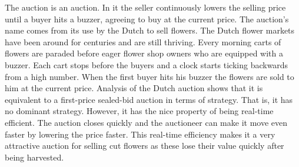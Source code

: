 \medskip


The  auction is an  auction.
In it the seller continuously lowers the selling price until a buyer
hits a buzzer, agreeing to buy at the current price. The auction's
name comes from its use by the Dutch to sell flowers. The Dutch flower
markets have been around for centuries and are still thriving. Every
morning carts of flowers are paraded before eager flower shop owners
who are equipped with a buzzer. Each cart stops before the buyers and
a clock starts ticking backwards from a high number. When the first
buyer hits his buzzer the flowers are sold to him at the current
price. Analysis of the Dutch auction shows that it is equivalent to a
first-price sealed-bid auction in terms of strategy. That is, it has
no dominant strategy. However, it has the nice property of being
real-time efficient. The auction closes quickly and the auctioneer can
make it move even faster by lowering the price faster.  This real-time
efficiency makes it a very attractive auction for selling cut flowers
as these lose their value quickly after being harvested.

\medskip



